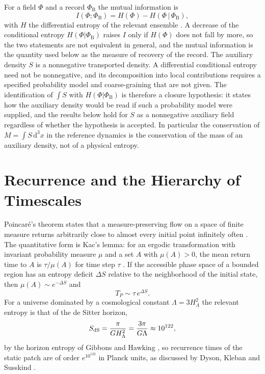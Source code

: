 \documentclass[11pt]{article}
\theoremstyle{definition}
\theoremstyle{remark}
\newcommand{\dd}{\mathrm{d}}
\newcommand{\Phib}{{\Phi_{\mathrm{B}}}}
\begin{document}
For a field $\Phi$ and a record $\Phib$ the mutual information is
\begin{equation}
I(\Phi;\Phib)=H(\Phi)-H(\Phi\,|\,\Phib),
\end{equation}
with $H$ the differential entropy of the relevant ensemble \cite{cover2006}. A decrease of the conditional entropy $H(\Phi|\Phib)$ raises $I$ only if $H(\Phi)$ does not fall by more, so the two statements are not equivalent in general, and the mutual information is the quantity used below as the measure of recovery of the record. The auxiliary density $S$ is a nonnegative transported density. A differential conditional entropy need not be nonnegative, and its decomposition into local contributions requires a specified probability model and coarse-graining that are not given. The identification of $\int S$ with $H(\Phi|\Phib)$ is therefore a closure hypothesis: it states how the auxiliary density would be read if such a probability model were supplied, and the results below hold for $S$ as a nonnegative auxiliary field regardless of whether the hypothesis is accepted. In particular the conservation of $M=\int S\,\dd^3x$ in the reference dynamics is the conservation of the mass of an auxiliary density, not of a physical entropy.

\section{Recurrence and the Hierarchy of Timescales}\label{sec:time}

Poincar\'e's theorem states that a measure-preserving flow on a space of finite measure returns arbitrarily close to almost every initial point infinitely often \cite{poincare1890}. The quantitative form is Kac's lemma: for an ergodic transformation with invariant probability measure $\mu$ and a set $A$ with $\mu(A)>0$, the mean return time to $A$ is $\tau/\mu(A)$ for time step $\tau$ \cite{kac1947}. If the accessible phase space of a bounded region has an entropy deficit $\Delta S$ relative to the neighborhood of the initial state, then $\mu(A)\sim e^{-\Delta S}$ and
\begin{equation}
T_P\sim\tau\,e^{\Delta S}.
\end{equation}
For a universe dominated by a cosmological constant $\Lambda=3H_\Lambda^2$ the relevant entropy is that of the de Sitter horizon,
\begin{equation}
S_{\rm dS}=\frac{\pi}{GH_\Lambda^2}=\frac{3\pi}{G\Lambda}\approx10^{122},
\end{equation}
by the horizon entropy of Gibbons and Hawking \cite{gibbons1977}, so recurrence times of the static patch are of order $e^{10^{122}}$ in Planck units, as discussed by Dyson, Kleban and Susskind \cite{dyson2002}.
\end{document}
